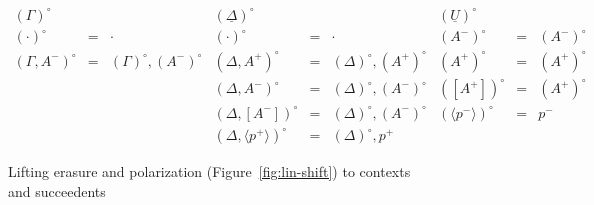\begin{figure}
{\small \[
\begin{array}{rcl|rcl|rcl}
{(\Gamma)^\circ} & & &
{(\underline{\Delta})^\circ} & & &
{(\underline{U})^\circ} & & 
\\
(\cdot)^\circ & \!\!\!=\!\!\! & \cdot &
(\cdot)^\circ & \!\!\!=\!\!\! & \cdot &
(A^-)^\circ & \!\!\!=\!\!\! & (A^-)^\circ
\\
(\Gamma, A^-)^\circ & \!\!\!=\!\!\! & (\Gamma)^\circ, (A^-)^\circ &
(\Delta, A^+)^\circ & \!\!\!=\!\!\! & (\Delta)^\circ, (A^+)^\circ &
(A^+)^\circ & \!\!\!=\!\!\! & (A^+)^\circ
\\
& & & 
(\Delta, A^-)^\circ & \!\!\!=\!\!\! & (\Delta)^\circ, (A^-)^\circ &
([A^+])^\circ & \!\!\!=\!\!\! & (A^+)^\circ 
\\
& & &
(\Delta, [ A^- ])^\circ & \!\!\!=\!\!\! & (\Delta)^\circ, (A^-)^\circ & 
(\langle p^- \rangle)^\circ & \!\!\!=\!\!\! & p^-
\\
& & &
(\Delta, \langle p^+ \rangle)^\circ & \!\!\!=\!\!\! & (\Delta)^\circ, p^+ & 
& &
\end{array}\]}
\caption{Lifting erasure and polarization (Figure~\ref{fig:lin-shift}) to
contexts and succeedents}
\label{fig:lin-shift-ctx}
\end{figure}
